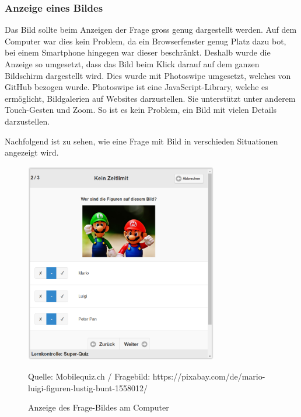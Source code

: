 \subsubsection{Anzeige eines Bildes}
Das Bild sollte beim Anzeigen der Frage gross genug dargestellt werden. Auf dem Computer war dies kein Problem, da ein Browserfenster genug Platz dazu bot, bei einem Smartphone hingegen war dieser beschränkt. Deshalb wurde die Anzeige so umgesetzt, dass das Bild beim Klick darauf auf dem ganzen Bildschirm dargestellt wird. Dies wurde mit Photoswipe \cite{photoswipe} umgesetzt, welches von GitHub \cite{github_photoswipe} bezogen wurde. Photoswipe ist eine JavaScript-Library, welche es ermöglicht, Bildgalerien auf Websites darzustellen. Sie unterstützt unter anderem Touch-Gesten und Zoom. So ist es kein Problem, ein Bild mit vielen Details darzustellen.

Nachfolgend ist zu sehen, wie eine Frage mit Bild in verschieden Situationen angezeigt wird.

\begin{figure}[H]
	\centering
	\includegraphics[width=0.75\textwidth]{Images/Frage-Bild_Anzeige_PC.PNG}
	\caption{Anzeige des Frage-Bildes am Computer}
	Quelle: Mobilequiz.ch / Fragebild: https://pixabay.com/de/mario-luigi-figuren-lustig-bunt-1558012/
\end{figure}

